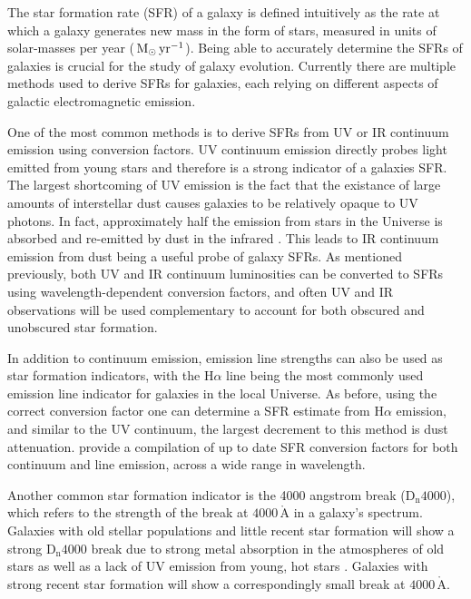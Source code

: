 The star formation rate (SFR) of a galaxy is defined intuitively as the rate
at which a galaxy generates new mass in the form of stars, measured in
units of solar-masses per year ($\,\mathrm{M_{\odot}}\,\mathrm{yr^{-1}}$).  Being
able to accurately determine the SFRs of galaxies is crucial for the
study of galaxy evolution.  Currently there are multiple methods used
to derive SFRs for galaxies, each relying on different aspects of
galactic electromagnetic emission.
\par
One of the most common methods is to derive SFRs from UV or IR
continuum 
emission using conversion factors.  UV continuum emission directly
probes light emitted from young stars and therefore is a strong
indicator of a galaxies SFR.  The largest shortcoming of UV emission
is the fact that the existance of large amounts of interstellar dust
causes galaxies to be relatively opaque to UV photons.  In fact,
approximately half the emission from stars in the Universe is absorbed
and re-emitted by dust in the infrared \citep{kennicutt2012}.
This leads to IR continuum emission from dust being a useful probe of
galaxy SFRs.  As mentioned previously, both UV and IR continuum
luminosities can be converted to SFRs using wavelength-dependent conversion factors, and often UV and IR observations will be used complementary to account for both obscured and unobscured star formation.
\par
In addition to continuum emission, emission line strengths can also be
used as star formation indicators, with the $\mathrm{H}\alpha$ line
being the most commonly used emission line indicator for galaxies in
the local Universe.  As before, using the correct conversion factor
one can determine a SFR estimate from $\mathrm{H}\alpha$ emission, and
similar to the UV continuum, the largest decrement to this method is
dust attenuation.  \citet{kennicutt2012} provide a compilation of up
to date SFR conversion factors for both continuum and line emission,
across a wide range in wavelength.
\par
Another common star formation indicator is the 4000 angstrom break
($\mathrm{D_n}4000$), which refers to the strength of the break at
$4000\,\mathrm{\mathring{A}}$ in a galaxy's spectrum.  Galaxies with
old stellar populations and little recent star formation will show a
strong $\mathrm{D_n}4000$ break due to strong metal absorption in the
atmospheres of old stars as well as a lack of UV emission from young,
hot stars \citep{hamilton1985}.  Galaxies with strong recent star
formation will show a correspondingly small break at
$4000\,\mathrm{\mathring{A}}$.
